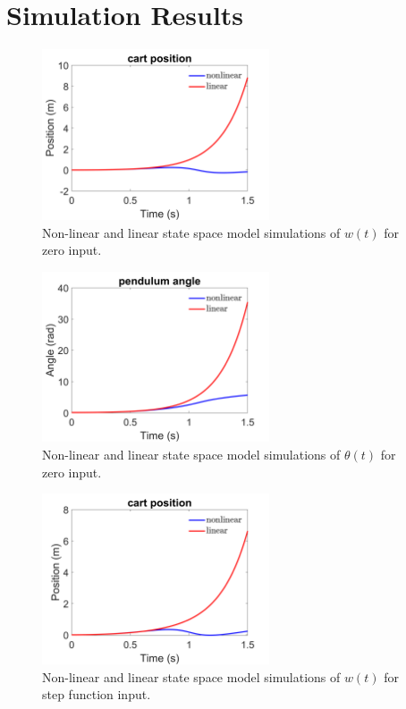 \documentclass[12pt]{article}
\numberwithin{equation}{section}
\begin{document}
\newpage

\section{Simulation Results}

\begin{figure}[!ht]
    \centering
    \includegraphics[width=0.6\textwidth]{w_open_loop.png}
    \caption{Non-linear and linear state space model simulations of $w(t)$ for zero input.}
    \label{fig:1}
\end{figure}

\begin{figure}[!ht]
    \centering
    \includegraphics[width=0.6\textwidth]{theta_open_loop.png}
    \caption{Non-linear and linear state space model simulations of $\theta(t)$ for zero input.}
    \label{fig:2}
\end{figure}

\begin{figure}[!ht]
    \centering
    \includegraphics[width=0.6\textwidth]{w_open_loop_step_input.png}
    \caption{Non-linear and linear state space model simulations of $w(t)$ for step function input.}
    \label{fig:3}
\end{figure}
\end{document}
